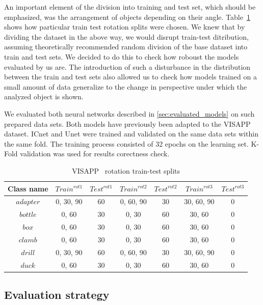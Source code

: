 \documentclass{article}
\begin{document}
An important element of the division into training and test set, which should be emphasized, was the arrangement of objects depending on their angle. Table~\ref{tab:rotation_splits} shows how particular train test rotation splits were chosen.
We knew that by dividing the dataset in the above way, we would disrupt train-test ditribution, assuming theoretically recommended random division of the base dataset into train and test sets. We decided to do this to check how roboust the models evaluated by us are. The introduction of such a disturbance in the distribution between the train and test sets also allowed us to check how models trained on a small amount of data generalize to the change in perspective under which the analyzed object is shown.

We evaluated both neural networks described in \ref{sec:evaluated_models} on such prepared data sets. Both models have previously been adapted to the VISAPP \cite{visapp} dataset. ICnet and Unet were trained and validated on the same data sets within the same fold. The training process consisted of 32 epochs on the learning set. K-Fold validation was used for results corectness check.

\begin{center}
\begin{table}[H]
\centering
\tiny \renewcommand{\arraystretch}{1.5}
\begin{tabular}
{ |c||c|c||c|c||c|c| } \hline Class name & $Train^{rot1}$ & $Test^{rot1}$ & $Train^{rot2}$ & $Test^{rot2}$ & $Train^{rot3}$ & $Test^{rot3}$\\ [1.05ex] \hline
$adapter$ &  0, 30, 90 & 60 & 0, 60, 90 & 30 & 30, 60, 90 & 0 \\ \hline
$bottle$ &  0, 60 & 30 & 0, 30 & 60 & 30, 60 & 0 \\ \hline
$box$ &  0, 60 & 30 & 0, 30 & 60 & 30, 60 & 0 \\ \hline
$clamb$ &  0, 60 & 30 & 0, 30 & 60 & 30, 60 & 0 \\ \hline
$drill$ &  0, 30, 90 & 60 & 0, 60, 90 & 30 & 30, 60, 90 & 0 \\ \hline
$duck$ &  0, 60 & 30 & 0, 30 & 60 & 30, 60 & 0 \\ \hline
\end{tabular}
\caption{VISAPP~\cite{visapp} rotation train-test splits}
\label{tab:rotation_splits}
\end{table}
\end{center}

\subsection{Evaluation strategy}
\label{sec:eval_strategy}
\end{document}
